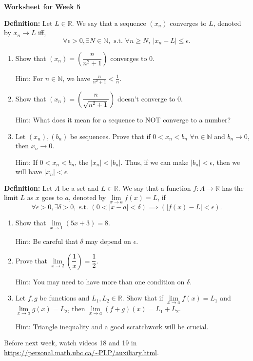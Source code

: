 \documentclass[12pt]{article}
\newcommand{\st}{\text{ s.t. }}
\begin{document}
\centerline{\bf\large Worksheet for Week 5}

\vspace{25pt}


\textbf{Definition:} Let $L\in\mathbb R$. We say that a sequence $(x_n)$ converges to $L$, denoted by $x_n\to L$ iff,
\[\forall \epsilon>0, \exists N\in\mathbb N, \st \forall n\geq N,\  |x_n-L|\leq \epsilon.\]

\begin{enumerate}

\item Show that $(x_n)=(\dfrac{n}{n^2+1})$ converges to $0$.

Hint: For $n\in\mathbb N$, we have $\frac{n}{n^2+1}<\frac{1}{n}$.

\item Show that $(x_n)=(\dfrac{n}{\sqrt{n^2+1}})$ doesn't converge to $0$.

Hint: What does it mean for a sequence to NOT converge to a number?

\item Let $(x_n), (b_n)$ be sequences. Prove that if $0<x_n<b_n$ $\forall n\in\mathbb N$ and $b_n\to 0$, then $x_n\to 0$.

Hint: If $0<x_n<b_n$, the $|x_n|<|b_n|$. Thus, if we can make $|b_n|<\epsilon$, then we will have $|x_n|<\epsilon$.

\end{enumerate}

\textbf{Definition:} Let $A$ be a set and $L\in\mathbb R$. We say that a function $f: A\to \mathbb R$ has the limit $L$ as $x$ goes to $a$, denoted by $\lim\limits_{x\to a}f(x)=L$, if
\[\forall \epsilon>0, \exists \delta>0, \st (0<|x-a|<\delta)\implies (|f(x)-L|<\epsilon). \]

\begin{enumerate}[resume]
\item Show that $\lim\limits_{x\to 1} (5x+3)=8$.

Hint: Be careful that $\delta$ may depend on $\epsilon$.

\item Prove that  $\lim\limits_{x\to 2}\left(\dfrac{1}{x}\right)=\dfrac 12$.

Hint: You may need to have more than one condition on $\delta$.

\item Let $f, g$ be functions and $L_1, L_2\in\mathbb R$. Show that if $\lim\limits_{x\to a}f(x)=L_1$ and $\lim\limits_{x\to a}g(x)=L_2$, then $\lim\limits_{x\to a}(f+g)(x)=L_1+L_2$.

Hint: Triangle inequality and a good scratchwork will be crucial.

\end{enumerate}

Before next week, watch videos 18 and 19 in \url{https://personal.math.ubc.ca/~PLP/auxiliary.html}.
\end{document}
